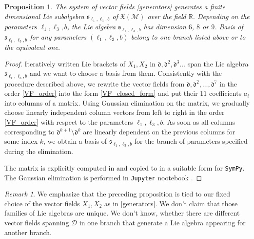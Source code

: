 \documentclass{amsart}
\theoremstyle{plain}
\newtheorem{proposition}[theorem]{Proposition}
\theoremstyle{definition}
\theoremstyle{remark}
\newtheorem*{remark}{Remark}
\newcommand{\R}{\mathbb{R}}
\newcommand{\mc}[1]{\mathcal{#1}}
\newcommand{\mfk}[1]{\mathfrak{#1}}
\begin{document}
\begin{proposition}\label{prop:branches}
    The system of vector fields \eqref{generators} generates a finite dimensional Lie subalgebra $\mfk{s}_{\ell_1,\ell_3,b}$ of $\mathfrak{X}(\mc{M})$ over the field $\R$. Depending on the parameters $\ell_1,\ell_3,b$, the Lie algebra $\mfk{s}_{\ell_1,\ell_3,b}$ has dimension $6$, $8$ or $9$. Basis of $\mfk{s}_{\ell_1,\ell_3,b}$ for any parameters $(\ell_1, \ell_3, b)$ belong to one branch listed above or to the equivalent one.
\end{proposition}
\begin{proof}
    Iteratively written Lie brackets of $X_1,X_2$ in $\mfk{d}, \mfk{d}^2, \mfk{d}^3\dots$ span the Lie algebra $\mfk{s}_{\ell_1, \ell_3, b}$ and we want to choose a basis from them. Consistently with the procedure described above, we rewrite the vector fields from $\mfk{d}, \mfk{d}^2, \dots, \mfk{d}^7$ in the order \eqref{VF_order} into the form \eqref{VF_closed_form} and put their $11$ coefficients $a_i$ into columns of a matrix. Using Gaussian elimination on the matrix, we gradually choose linearly independent column vectors from left to right in the order \eqref{VF_order} with respect to the parameters $\ell_1, \ell_3, b$. As soon as all columns corresponding to $\mfk{d}^{k+1} \setminus \mfk{d}^k$ are linearly dependent on the previous columns for some index $k$, we obtain a basis of $\mfk{s}_{\ell_1, \ell_3, b}$ for the branch of parameters specified during the elimination.
    
    The matrix is explicitly computed in \cite[\texttt{vectorfields.mw}]{attached_files} and copied to \cite[\texttt{snake\_coefficient\_matrix.py}]{attached_files} in a suitable form for \texttt{SymPy}. The Gaussian elimination is performed in \texttt{Jupyter} nootebook \cite[\texttt{parameter\_depended\_basis.ipynb}]{attached_files}.
\end{proof}

\begin{remark}
    We emphasize that the preceding proposition is tied to our fixed choice of the vector fields $X_1,X_2$ as in \eqref{generators}. We don't claim that those families of Lie algebras are unique. We don't know, whether there are different vector fields spanning $\mc{D}$ in one branch that generate a Lie algebra appearing for another branch.
\end{remark}
\end{document}
